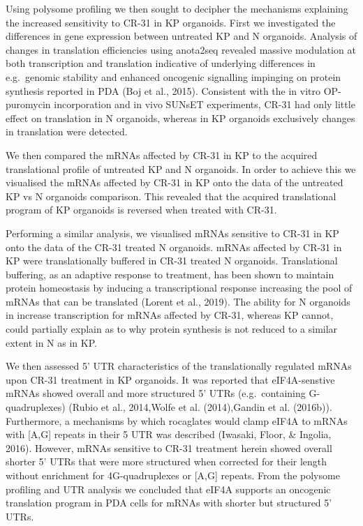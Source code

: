 \documentclass[12pt,openany]{book}
\begin{document}
Using polysome profiling we then sought to decipher the mechanisms
explaining the increased sensitivity to CR-31 in KP organoids. First we
investigated the differences in gene expression between untreated KP and
N organoids. Analysis of changes in translation efficiencies using
anota2seq revealed massive modulation at both transcription and
translation indicative of underlying differences in e.g.~genomic
stability and enhanced oncogenic signalling impinging on protein
synthesis reported in PDA (Boj et al., 2015). Consistent with the in
vitro OP-puromycin incorporation and in vivo SUNsET experiments, CR-31
had only little effect on translation in N organoids, whereas in KP
organoids exclusively changes in translation were detected.

We then compared the mRNAs affected by CR-31 in KP to the acquired
translational profile of untreated KP and N organoids. In order to
achieve this we visualised the mRNAs affected by CR-31 in KP onto the
data of the untreated KP vs N organoids comparison. This revealed that
the acquired translational program of KP organoids is reversed when
treated with CR-31.

Performing a similar analysis, we visualised mRNAs sensitive to CR-31 in
KP onto the data of the CR-31 treated N organoids. mRNAs affected by
CR-31 in KP were translationally buffered in CR-31 treated N organoids.
Translational buffering, as an adaptive response to treatment, has been
shown to maintain protein homeostasis by inducing a transcriptional
response increasing the pool of mRNAs that can be translated (Lorent et
al., 2019). The ability for N organoids in increase transcription for
mRNAs affected by CR-31, whereas KP cannot, could partially explain as
to why protein synthesis is not reduced to a similar extent in N as in
KP.

We then assessed 5' UTR characteristics of the translationally regulated
mRNAs upon CR-31 treatment in KP organoids. It was reported that
eIF4A-senstive mRNAs showed overall and more structured 5' UTRs
(e.g.~containing G-quadruplexes) (Rubio et al., 2014,Wolfe et al.
(2014),Gandin et al. (2016b)). Furthermore, a mechanisms by which
rocaglates would clamp eIF4A to mRNAs with {[}A,G{]} repeats in their 5
UTR was described (Iwasaki, Floor, \& Ingolia, 2016). However, mRNAs
sensitive to CR-31 treatment herein showed overall shorter 5' UTRs that
were more structured when corrected for their length without enrichment
for 4G-quadruplexes or {[}A,G{]} repeats. From the polysome profiling
and UTR analysis we concluded that eIF4A supports an oncogenic
translation program in PDA cells for mRNAs with shorter but structured
5' UTRs.
\end{document}
